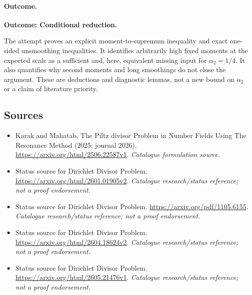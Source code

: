 \documentclass[11pt,a4paper]{article}
\numberwithin{equation}{section}
\begin{document}
\paragraph{Outcome.}
\textbf{Outcome: Conditional reduction.}

The attempt proves an explicit moment-to-supremum inequality and exact
one-sided unsmoothing inequalities. It identifies arbitrarily high fixed
moments at the expected scale as a sufficient and, here, equivalent missing
input for $\alpha_2=1/4$. It also quantifies why second moments and long
smoothings do not close the argument. These are deductions and diagnostic
lemmas, not a new bound on $\alpha_2$ or a claim of literature priority.
\subsection{Sources}
\begin{itemize}\raggedright
\item[\textnormal{[S1]}]\hypertarget{source:170:1}{} Karak and Mahatab, The Piltz divisor Problem in Number Fields Using The Resonance Method (2025; journal 2026).
\url{https://arxiv.org/html/2506.22587v1}.
{\small\textit{Catalogue formulation source.}}
\item[\textnormal{[S2]}]\hypertarget{source:170:2}{} Status source for Dirichlet Divisor Problem.
\url{https://arxiv.org/html/2601.01905v2}.
{\small\textit{Catalogue research/status reference; not a proof endorsement.}}
\item[\textnormal{[S3]}]\hypertarget{source:170:3}{} Status source for Dirichlet Divisor Problem.
\url{https://arxiv.org/pdf/1105.6155}.
{\small\textit{Catalogue research/status reference; not a proof endorsement.}}
\item[\textnormal{[S4]}]\hypertarget{source:170:4}{} Status source for Dirichlet Divisor Problem.
\url{https://arxiv.org/html/2604.18624v2}.
{\small\textit{Catalogue research/status reference; not a proof endorsement.}}
\item[\textnormal{[S5]}]\hypertarget{source:170:5}{} Status source for Dirichlet Divisor Problem.
\url{https://arxiv.org/html/2605.21476v1}.
{\small\textit{Catalogue research/status reference; not a proof endorsement.}}
\end{itemize}
\end{document}
